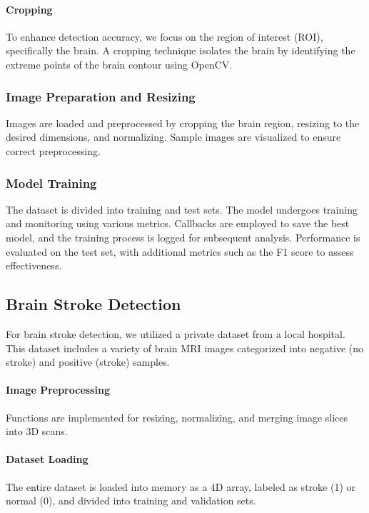 \documentclass[conference]{IEEEtran}
\begin{document}
\paragraph{Cropping}
To enhance detection accuracy, we focus on the region of interest (ROI), specifically the brain. A cropping technique isolates the brain by identifying the extreme points of the brain contour using OpenCV.

\subsubsection{Image Preparation and Resizing}
Images are loaded and preprocessed by cropping the brain region, resizing to the desired dimensions, and normalizing. Sample images are visualized to ensure correct preprocessing.

\subsubsection{Model Training}
The dataset is divided into training and test sets. The model undergoes training and monitoring using various metrics. Callbacks are employed to save the best model, and the training process is logged for subsequent analysis. Performance is evaluated on the test set, with additional metrics such as the F1 score to assess effectiveness.

\subsection{Brain Stroke Detection}

For brain stroke detection, we utilized a private dataset from a local hospital. This dataset includes a variety of brain MRI images categorized into negative (no stroke) and positive (stroke) samples.

\paragraph{Image Preprocessing}
Functions are implemented for resizing, normalizing, and merging image slices into 3D scans.

\paragraph{Dataset Loading}
The entire dataset is loaded into memory as a 4D array, labeled as stroke (1) or normal (0), and divided into training and validation sets.
\end{document}
